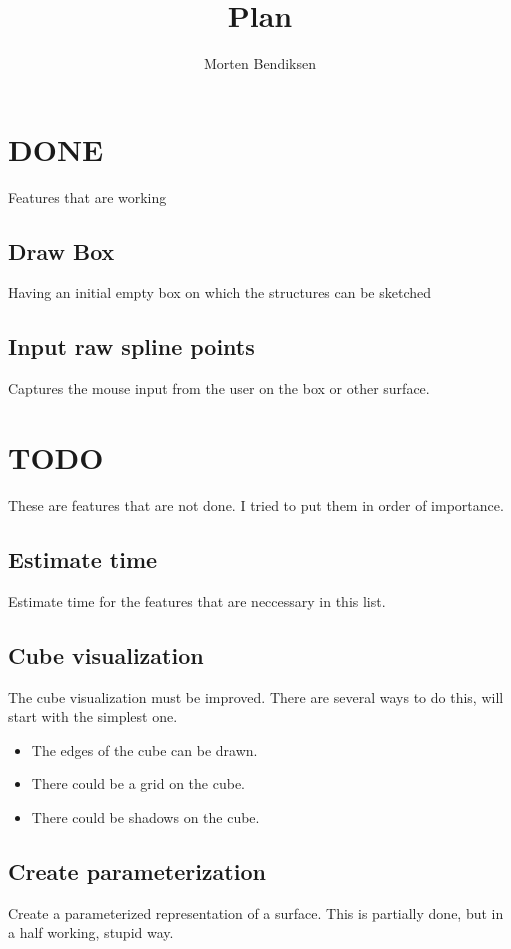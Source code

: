 \documentclass[a4paper,10pt]{article}
\title{Plan}
\author{Morten Bendiksen}
\begin{document}
\maketitle

\begin{abstract}

\end{abstract}

\section*{DONE}
Features that are working
\subsection*{Draw Box}
Having an initial empty box on which the structures can be sketched
\subsection*{Input raw spline points}
Captures the mouse input from the user on the box or other surface.

\section*{TODO}
These are features that are not done. I tried to put them in order of importance.
\subsection*{Estimate time}
Estimate time for the features that are neccessary in this list.
\subsection*{Cube visualization}
The cube visualization must be improved. There are several ways to do this, will start with the simplest one.
\begin{itemize}
 \item The edges of the cube can be drawn.
 \item There could be a grid on the cube.
 \item There could be shadows on the cube.
\end{itemize}
\subsection*{Create parameterization}
Create a parameterized representation of a surface. This is partially done, but in a half working, stupid way.
\end{document}
